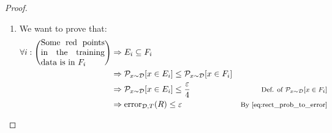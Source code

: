 \begin{theorem}
\begin{proof}
\begin{enumerate}
            \item
                We want to prove that:
                \begin{equation} \label{eq:rect_points_to_error}
                    \begin{aligned}
                        \forall i: \left( \parbox{2.7cm}{Some red points in the training data is in $F_i$} \right) &\Rightarrow
                            E_i \subseteq F_i \\
                            & \Rightarrow \mathcal{P}_{x \sim \mathcal{D}}[x \in E_i] \leq \mathcal{P}_{x \sim \mathcal{D}}[x \in F_i] \\
                            & \Rightarrow \mathcal{P}_{x \sim \mathcal{D}}[x \in E_i] \leq \frac{\varepsilon}{4}
                                & \text{\footnotesize Def. of $\mathcal{P}_{x \sim \mathcal{D}}[x \in F_i]$} \\
                            & \Rightarrow \text{error}_{\mathcal{D}, T}(R) \leq \varepsilon 
                                & \text{\footnotesize By \Cref{eq:rect_prob_to_error}}
                    \end{aligned}    
                \end{equation}
        \end{enumerate}
        

\end{proof}
\end{theorem}

